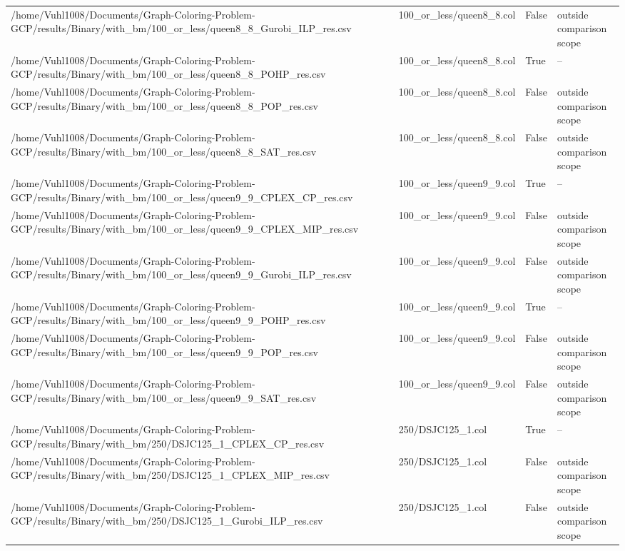 \begin{table}[htbp]
\begin{tabular}{llll}
/home/Vuhl1008/Documents/Graph-Coloring-Problem-GCP/results/Binary/with\_bm/100\_or\_less/queen8\_8\_Gurobi\_ILP\_res.csv & 100\_or\_less/queen8\_8.col & False & outside comparison scope \\
/home/Vuhl1008/Documents/Graph-Coloring-Problem-GCP/results/Binary/with\_bm/100\_or\_less/queen8\_8\_POHP\_res.csv & 100\_or\_less/queen8\_8.col & True & -- \\
/home/Vuhl1008/Documents/Graph-Coloring-Problem-GCP/results/Binary/with\_bm/100\_or\_less/queen8\_8\_POP\_res.csv & 100\_or\_less/queen8\_8.col & False & outside comparison scope \\
/home/Vuhl1008/Documents/Graph-Coloring-Problem-GCP/results/Binary/with\_bm/100\_or\_less/queen8\_8\_SAT\_res.csv & 100\_or\_less/queen8\_8.col & False & outside comparison scope \\
/home/Vuhl1008/Documents/Graph-Coloring-Problem-GCP/results/Binary/with\_bm/100\_or\_less/queen9\_9\_CPLEX\_CP\_res.csv & 100\_or\_less/queen9\_9.col & True & -- \\
/home/Vuhl1008/Documents/Graph-Coloring-Problem-GCP/results/Binary/with\_bm/100\_or\_less/queen9\_9\_CPLEX\_MIP\_res.csv & 100\_or\_less/queen9\_9.col & False & outside comparison scope \\
/home/Vuhl1008/Documents/Graph-Coloring-Problem-GCP/results/Binary/with\_bm/100\_or\_less/queen9\_9\_Gurobi\_ILP\_res.csv & 100\_or\_less/queen9\_9.col & False & outside comparison scope \\
/home/Vuhl1008/Documents/Graph-Coloring-Problem-GCP/results/Binary/with\_bm/100\_or\_less/queen9\_9\_POHP\_res.csv & 100\_or\_less/queen9\_9.col & True & -- \\
/home/Vuhl1008/Documents/Graph-Coloring-Problem-GCP/results/Binary/with\_bm/100\_or\_less/queen9\_9\_POP\_res.csv & 100\_or\_less/queen9\_9.col & False & outside comparison scope \\
/home/Vuhl1008/Documents/Graph-Coloring-Problem-GCP/results/Binary/with\_bm/100\_or\_less/queen9\_9\_SAT\_res.csv & 100\_or\_less/queen9\_9.col & False & outside comparison scope \\
/home/Vuhl1008/Documents/Graph-Coloring-Problem-GCP/results/Binary/with\_bm/250/DSJC125\_1\_CPLEX\_CP\_res.csv & 250/DSJC125\_1.col & True & -- \\
/home/Vuhl1008/Documents/Graph-Coloring-Problem-GCP/results/Binary/with\_bm/250/DSJC125\_1\_CPLEX\_MIP\_res.csv & 250/DSJC125\_1.col & False & outside comparison scope \\
/home/Vuhl1008/Documents/Graph-Coloring-Problem-GCP/results/Binary/with\_bm/250/DSJC125\_1\_Gurobi\_ILP\_res.csv & 250/DSJC125\_1.col & False & outside comparison scope \\

\end{tabular}
\end{table}
